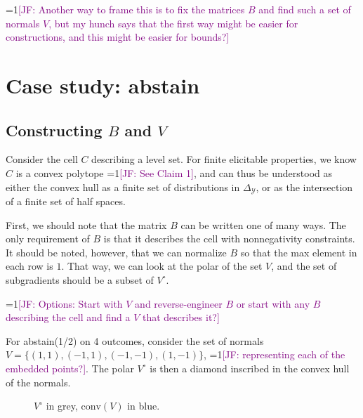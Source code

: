 \documentclass[12pt]{article}
\newcommand{\Comments}{1}
\newcommand{\mynote}[2]{\ifnum\Comments=1\textcolor{#1}{#2}\fi}
\newcommand{\jessie}[1]{\mynote{purple}{[JF: #1]}}
\newcommand{\Y}{\mathcal{Y}}
\newcommand{\conv}{\mathrm{conv}}
\newcommand{\simplex}{\Delta_\Y}
\begin{document}
\jessie{Another way to frame this is to fix the matrices $B$ and find such a set of normals $V$, but my hunch says that the first way might be easier for constructions, and this might be easier for bounds?}


\section{Case study: abstain}
\subsection{Constructing $B$ and $V$}
Consider the cell $C$ describing a level set.
For finite elicitable properties, we know $C$ is a convex polytope \jessie{See Claim 1}, and can thus be understood as either the convex hull as a finite set of distributions in $\simplex$, or as the intersection of a finite set of half spaces.

First, we should note that the matrix $B$ can be written one of many ways.
The only requirement of $B$ is that it describes the cell with nonnegativity constraints.
It should be noted, however, that we can normalize $B$ so that the max element in each row is $1$.
That way, we can look at the polar of the set $V$, and the set of subgradients should be a subset of $V^\circ$.

\jessie{Options: Start with $V$ and reverse-engineer $B$ or start with any $B$ describing the cell and find a $V$ that describes it?}

For abstain(1/2) on 4 outcomes, consider the set of normals $V = \{(1,1), (-1,1), (-1,-1), (1,-1)\}$, \jessie{representing each of the embedded points?}.
The polar $V^\circ$ is then a diamond inscribed in the convex hull of the normals.
\begin{figure}
\begin{center}
\caption{$V^\circ$ in grey, $\conv(V)$ in blue.}
\label{fig:abstain-polar}
\end{center}
\end{figure}
\end{document}
